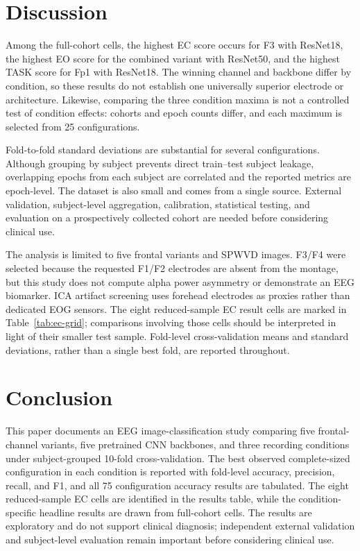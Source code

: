 \documentclass[conference]{IEEEtran}
\begin{document}
\section{Discussion}
Among the full-cohort cells, the highest EC score occurs for
F3 with ResNet18, the highest EO score for the combined variant with
ResNet50, and the highest TASK score for Fp1 with ResNet18. The
winning channel and backbone differ by condition, so these results do
not establish one universally superior electrode or architecture.
Likewise, comparing the three condition maxima is not a controlled
test of condition effects: cohorts and epoch counts differ, and each
maximum is selected from 25 configurations.

Fold-to-fold standard deviations are substantial for several
configurations. Although grouping by subject prevents direct
train--test subject leakage, overlapping epochs from each subject are
correlated and the reported metrics are epoch-level. The dataset is
also small and comes from a single source. External validation,
subject-level aggregation, calibration, statistical testing, and
evaluation on a prospectively collected cohort are needed before
considering clinical use.

The analysis is limited to five frontal variants and SPWVD images.
F3/F4 were selected because the requested F1/F2 electrodes are absent
from the montage, but this study does not compute alpha power
asymmetry or demonstrate an EEG biomarker. ICA artifact screening uses
forehead electrodes as proxies rather than dedicated EOG sensors.
The eight reduced-sample EC result cells are marked in
Table~\ref{tab:ec-grid}; comparisons involving those cells should be
interpreted in light of their smaller test sample. Fold-level
cross-validation means and standard deviations, rather than a single
best fold, are reported throughout.

\section{Conclusion}
This paper documents an EEG image-classification study comparing five
frontal-channel variants, five pretrained CNN backbones, and three
recording conditions under subject-grouped 10-fold cross-validation.
The best observed complete-sized configuration in each condition is
reported with fold-level accuracy, precision, recall, and F1, and
all 75 configuration accuracy results are tabulated. The eight
reduced-sample EC cells are identified in the results table, while the
condition-specific headline results are drawn from full-cohort cells.
The results are exploratory and do not support clinical diagnosis;
independent external validation and subject-level evaluation remain
important before considering clinical use.
\end{document}
